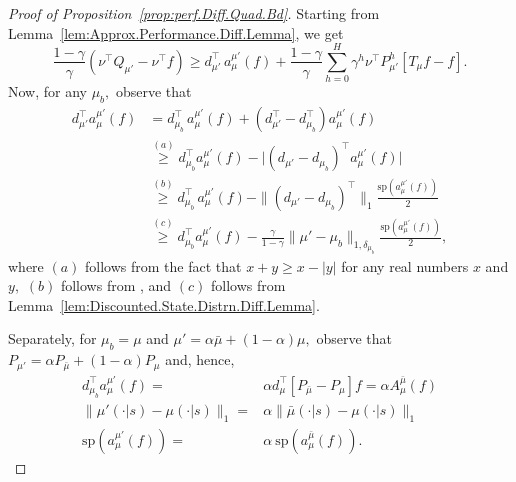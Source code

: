 \documentclass[twoside]{article}
\theoremstyle{plain}
\theoremstyle{definition}
\theoremstyle{remark}
\renewcommand{\sp}{\mathrm{sp}}
\newcommand{\tr}{\top}
\newcommand{\mup}{\mu'}
\newcommand{\mub}{\bar{\mu}}
\begin{document}
\begin{proof}[Proof of Proposition~\ref{prop:perf.Diff.Quad.Bd}]
%
    Starting from Lemma~\ref{lem:Approx.Performance.Diff.Lemma}, we get 
    \begin{equation}
    \label{e:nu.Q.mup.nu.f.Bd1}
        \frac{1-\gamma}{\gamma} (\nu^\tr Q_{\mup}  - \nu^\tr f) 
            \ge d_{\mup}^\tr\,a_\mu^{\mup}(f)  + \frac{1 - \gamma}{\gamma} \sum_{h = 0}^H \gamma^h \nu^\tr P_{\mup}^h [T_{\mu}f - f].
    \end{equation}
    Now, for any $\mu_b,$ observe that 
    \begin{align}
            d_{\mup}^\tr a_{\mu}^{\mup}(f) 
            & =  d_{\mu_b}^\tr\,a_\mu^{\mup}(f) + (d_{\mup}^\tr - d_{\mu_b}^\tr) a_\mu^{\mup}(f) \nonumber \\
            &\overset{(a)}{\geq} d_{\mu_b}^\tr a_\mu^{\mup}(f) - \bigl|(d_{\mup}-d_{\mu_b})^\tr a_\mu^{\mup}(f)\bigr| \nonumber \\
            &\overset{(b)}{\geq} d_{\mu_b}^\tr\,a_\mu^{\mup}(f) - \|(d_{\mup}-d_{\mu_b})^\tr \|_1\frac{\mathrm{sp}(a_\mu^{\mup}(f))}{2} \nonumber \\
            &\overset{(c)}{\geq} d_{\mu_b}^\tr a_\mu^{\mup}(f)
            -  \frac{\gamma}{1 - \gamma} \|\mup - \mu_b\|_{1, \delta_{\mu_b}}\frac{\mathrm{sp}(a_\mu^{\mup}(f))}{2}, \label{e:nu.Q.mup.nu.f.Bd2}
    \end{align}
where $(a)$ follows from the fact that $x + y \geq x -|y|$ for any real numbers $x$ and $y,$ $(b)$ follows from \cite[Corollary 2.4]{haviv1984}, and $(c)$ follows from Lemma~\ref{lem:Discounted.State.Distrn.Diff.Lemma}.

Separately, for $\mu_b = \mu$ and $\mup = \alpha \mub + (1 - \alpha) \mu,$ observe that $P_{\mup} = \alpha P_{\mub} + (1 - \alpha) P_{\mu}$ and, hence, 
    \begin{equation}
    \label{e:nu.Q.mup.nu.f.Bd3}
        \begin{aligned}
           d_{\mu_b}^\tr a_{\mu}^{\mup}(f)
           = {} & \alpha d_{\mu}^\tr [P_{\mub}- P_{\mu}]f
           = \alpha A_{\mu}^{\mub}(f) \\
           \|\mup(\cdot|s) - \mu(\cdot|s)\|_1 = {} &  \alpha \|\mub(\cdot|s) - \mu(\cdot|s)\|_1\\
           \sp(a_\mu^{\mup}(f)) = {} & \alpha\  \sp(a_\mu^{\mub}(f)).
        \end{aligned}
    \end{equation}


\end{proof}
\end{document}
